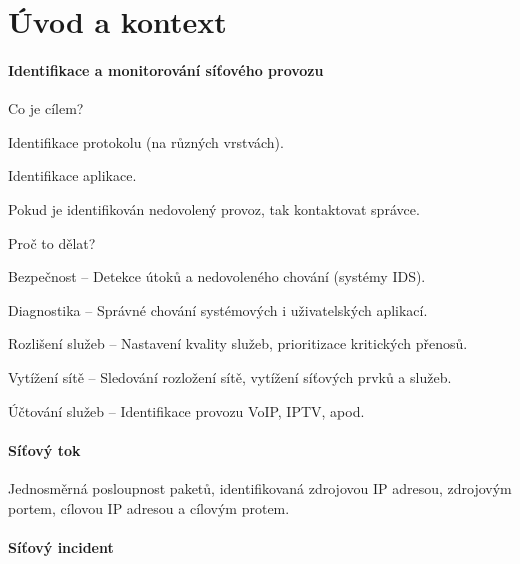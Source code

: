 
\section{Úvod a kontext}

\paragraph*{Identifikace a monitorování síťového provozu} \begin{compactitem}
    \item Co je cílem? \begin{compactitem}
        \item Identifikace protokolu (na různých vrstvách).
        \item Identifikace aplikace.
        \item Pokud je identifikován nedovolený provoz, tak kontaktovat správce.
    \end{compactitem}
    \item Proč to dělat? \begin{compactitem}
        \item Bezpečnost -- Detekce útoků a nedovoleného chování (systémy IDS).
        \item Diagnostika -- Správné chování systémových i uživatelských aplikací.
        \item Rozlišení služeb -- Nastavení kvality služeb, prioritizace kritických přenosů.
        \item Vytížení sítě -- Sledování rozložení sítě, vytížení síťových prvků a služeb.
        \item Účtování služeb -- Identifikace provozu VoIP, IPTV, apod.
    \end{compactitem}
\end{compactitem}

\paragraph*{Síťový tok} Jednosměrná posloupnost paketů, identifikovaná zdrojovou IP adresou, zdrojovým portem, cílovou IP adresou a cílovým protem.

\paragraph*{Síťový incident} 

